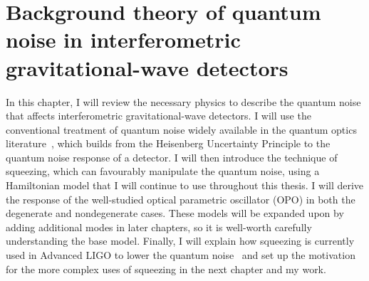 \chapter{Background theory of quantum noise in interferometric gravitational-wave detectors} %
\label{chp:background_theory}





In this chapter, I will review the necessary physics to describe the quantum noise that affects interferometric gravitational-wave detectors. I will use the conventional treatment of quantum noise widely available in the quantum optics literature~\cite{Danilishin,MiaoQCRB}, which builds from the Heisenberg Uncertainty Principle to the quantum noise response of a detector. 
I will then introduce the technique of squeezing, which can favourably manipulate the quantum noise, using a Hamiltonian model that I will continue to use throughout this thesis. I will derive the response of the well-studied optical parametric oscillator (OPO) in both the degenerate and nondegenerate cases. These models will be expanded upon by adding additional modes in later chapters, so it is well-worth carefully understanding the base model. Finally, I will explain how squeezing is currently used in Advanced LIGO to lower the quantum noise~\cite{} and set up the motivation for the more complex uses of squeezing in the next chapter and my work.


